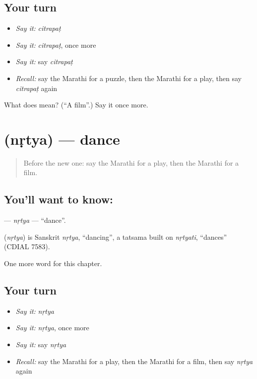 \subsection*{Your turn}
\begin{itemize}
\raggedright
  \item \emph{Say it:} \emph{citrapaṭ}
  \item \emph{Say it:} \emph{citrapaṭ}, once more
  \item \emph{Say it:} say \emph{citrapaṭ}
  \item \emph{Recall:} say the Marathi for a puzzle, then the Marathi for a play, then say \emph{citrapaṭ} again
\end{itemize}

\begin{tcolorbox}[breakable,colback=teal!4,colframe=teal!35!black,title={Before you move on}]
What does  mean? (\textquotedblleft{}A film\textquotedblright{}.) Say it once more.
\end{tcolorbox}
\section[\texorpdfstring{\mr{नृत्य} (nṛtya)}{नृत्य (nṛtya)}]{ (nṛtya) — dance}

\label{lesson:MR-C275-nrtya}



\begin{quote}
Before the new one: say the Marathi for a play, then the Marathi for a film.
\end{quote}

\subsection*{You'll want to know: }
\textbf{} — \emph{nṛtya} — \textquotedblleft{}dance\textquotedblright{}.

\begin{cousinweb}
\textbf{} (\emph{nṛtya}) is Sanskrit \emph{nṛtya}, \textquotedblleft{}dancing\textquotedblright{}, a tatsama built on \emph{nṛtyati}, \textquotedblleft{}dances\textquotedblright{} (CDIAL 7583).
\end{cousinweb}

\begin{grammarlens}[title={What you've built}]
One more word for this chapter.
\end{grammarlens}

\subsection*{Your turn}
\begin{itemize}
\raggedright
  \item \emph{Say it:} \emph{nṛtya}
  \item \emph{Say it:} \emph{nṛtya}, once more
  \item \emph{Say it:} say \emph{nṛtya}
  \item \emph{Recall:} say the Marathi for a play, then the Marathi for a film, then say \emph{nṛtya} again
\end{itemize}

